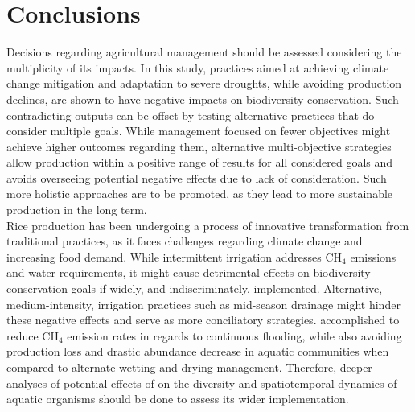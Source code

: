 \section{Conclusions}
\label{sec:conc}

Decisions regarding agricultural management should be assessed considering the multiplicity of its impacts. In this study, practices aimed at achieving climate change mitigation and adaptation to severe droughts, while avoiding production declines, are shown to have negative impacts on biodiversity conservation. Such contradicting outputs can be offset by testing alternative practices that do consider multiple goals. While management focused on fewer objectives might achieve higher outcomes regarding them, alternative multi-objective strategies allow production within a positive range of results for all considered goals and avoids overseeing potential negative effects due to lack of consideration. Such more holistic approaches are to be promoted, as they lead to more sustainable production in the long term. \\

Rice production has been undergoing a process of innovative transformation from traditional practices, as it faces challenges regarding climate change and increasing food demand. While intermittent irrigation addresses CH$_{4}$ emissions and water requirements, it might cause detrimental effects on biodiversity conservation goals if widely, and indiscriminately, implemented.  Alternative, medium-intensity, irrigation practices such as mid-season drainage might hinder these negative effects and serve as more conciliatory strategies. accomplished to reduce CH$_{4}$ emission rates in regards to continuous flooding, while also avoiding production loss and drastic abundance decrease in aquatic communities when compared to alternate wetting and drying management. Therefore, deeper analyses of potential effects of  on the diversity and spatiotemporal dynamics of aquatic organisms should be done to assess its wider implementation.\\

